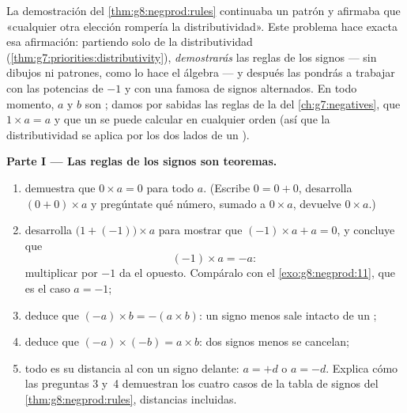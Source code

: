 \begin{problem}
\label{pb:g8:negprod:1}
La demostración del \cref{thm:g8:negprod:rules} continuaba un patrón y
afirmaba que «cualquier otra elección rompería la distributividad». Este
problema hace exacta esa afirmación: partiendo solo de la distributividad
(\cref{thm:g7:priorities:distributivity}), \emph{demostrarás} las
reglas de los signos --- sin dibujos ni patrones, como lo hace el álgebra ---
y después las pondrás a trabajar con las potencias de $-1$ y con una  famosa de
signos alternados. En todo momento, $a$ y $b$ son ; damos
por sabidas las reglas de la  del \cref{ch:g7:negatives}, que
$1 \times a = a$ y que un  se puede calcular en cualquier orden
(así que la distributividad se aplica por los dos lados de un ).

\medskip
\noindent\textbf{Parte I --- Las reglas de los signos son teoremas.}
\begin{enumerate}
  \item demuestra que $0 \times a = 0$ para todo  $a$.
        (Escribe $0 = 0 + 0$, desarrolla $(0 + 0) \times a$ y pregúntate qué
        número, sumado a $0 \times a$, devuelve $0 \times a$.)
  \item desarrolla $\bigl(1 + (-1)\bigr) \times a$ para mostrar que
        $(-1) \times a + a = 0$, y concluye que
        \[
        (-1) \times a = -a :
        \]
        multiplicar por $-1$ da el opuesto. Compáralo con el
        \cref{exo:g8:negprod:11}, que es el caso $a = -1$;
  \item deduce que $(-a) \times b = -(a \times b)$: un signo menos
        sale intacto de un ;
  \item deduce que $(-a) \times (-b) = a \times b$: dos signos menos
        se cancelan;
  \item todo  es su distancia al  con un signo
        delante: $a = +d$ o $a = -d$. Explica cómo las preguntas 3 y~4
        demuestran los cuatro casos de la tabla de signos del
        \cref{thm:g8:negprod:rules}, distancias incluidas.
\end{enumerate}


\end{problem}
